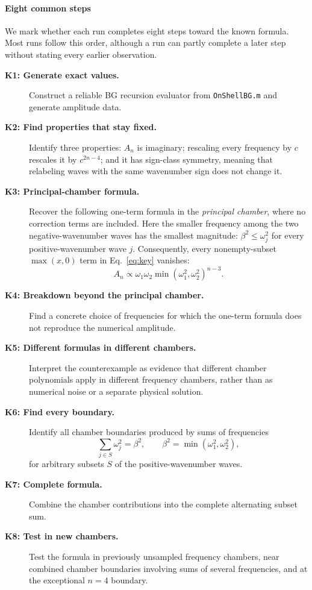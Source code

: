 \documentclass{article}
\begin{document}
\paragraph{Eight common steps}
We mark whether each run completes eight steps toward the known formula. Most
runs follow this order, although a run can partly complete a later step without
stating every earlier observation.

\begin{description}
    \item[\textbf{K1: Generate exact values.}]
    Construct a reliable BG recursion evaluator from \texttt{OnShellBG.m} and generate
    amplitude data.

    \item[\textbf{K2: Find properties that stay fixed.}]
    Identify three properties: $A_n$ is imaginary; rescaling every frequency
    by $c$ rescales it by $c^{2n-4}$; and it has sign-class symmetry, meaning
    that relabeling waves with the same wavenumber sign does not change it.

    \item[\textbf{K3: Principal-chamber formula.}]
    Recover the following one-term formula in the \emph{principal chamber}, where no
    correction terms are included. Here the smaller frequency among the two
    negative-wavenumber waves has the smallest magnitude:
    $\beta^2\leq\omega_j^2$ for every positive-wavenumber wave $j$. Consequently,
    every nonempty-subset $\max(x,0)$ term in Eq.~\eqref{eq:key} vanishes:
    \[
    A_n\propto
    \omega_1\omega_2
    \min(\omega_1^2,\omega_2^2)^{n-3}.
    \]

    \item[\textbf{K4: Breakdown beyond the principal chamber.}]
    Find a concrete choice of frequencies for which the one-term formula does not
    reproduce the numerical amplitude.

    \item[\textbf{K5: Different formulas in different chambers.}]
    Interpret the counterexample as evidence that different chamber
    polynomials apply in different frequency chambers, rather than as numerical noise or a
    separate physical solution.

    \item[\textbf{K6: Find every boundary.}]
    Identify all chamber boundaries produced by sums of frequencies
    \[
    \sum_{j\in S}\omega_j^2=\beta^2,
    \qquad
    \beta^2=\min(\omega_1^2,\omega_2^2),
    \]
    for arbitrary subsets $S$ of the positive-wavenumber waves.

    \item[\textbf{K7: Complete formula.}]
    Combine the chamber contributions into the complete alternating subset sum.

    \item[\textbf{K8: Test in new chambers.}]
    Test the formula in previously unsampled frequency chambers, near combined
    chamber boundaries involving sums of several frequencies, and at the exceptional
    $n=4$ boundary.
\end{description}
\end{document}
